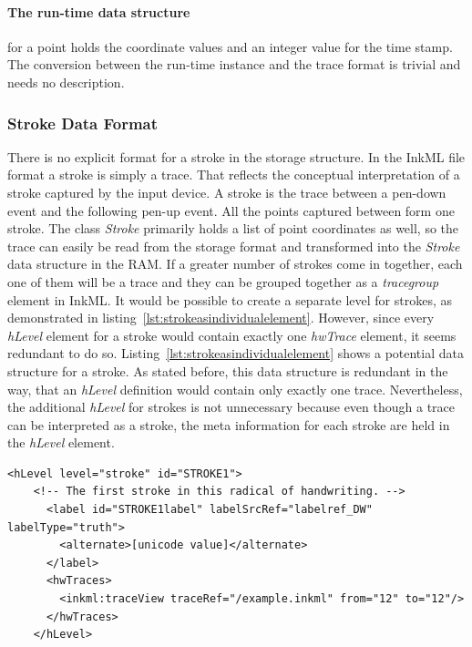 \paragraph{The run-time data structure} for a point holds the coordinate values 
and an integer value for the time stamp. The conversion between the run-time 
instance and the trace format is trivial and needs no description.

\subsubsection{Stroke Data Format}
\label{sec:hwre:strokedataformat}

There is no explicit format for a stroke in the storage structure.
In the InkML file format a stroke is simply a trace. That reflects the
conceptual interpretation of a stroke captured by the input device.
A stroke is the trace between a pen-down event and the following pen-up
event. All the points captured between form one stroke.
The class \emph{Stroke} primarily holds a list of point coordinates
as well, so the trace can easily be read from the storage format and 
transformed into the \emph{Stroke} data structure in the RAM.
If a greater number of strokes come in together, each one of them will be a trace
and they can be grouped together as a \emph{tracegroup} element in InkML.
It would be possible to create a separate level for strokes, as demonstrated
in listing~\ref{lst:strokeasindividualelement}. However, since every 
\emph{hLevel} element for a stroke would contain exactly one \emph{hwTrace} 
element, it seems redundant to do so.
Listing~\ref{lst:strokeasindividualelement} shows a potential data structure
for a stroke. As stated before, this data structure is redundant in the way, 
that an \emph{hLevel} definition would contain only exactly one trace.
Nevertheless, the additional \emph{hLevel} for strokes is not unnecessary
because even though a trace can be interpreted as a stroke,
the meta information for each stroke are held in the \emph{hLevel} element.

\begin{xmlcode}
  \begin{lstlisting}[emph={hLevel,hwTraces,label,alternative},
                     emphstyle=\color{blue}\textbf,
                     emph={[2]level,labelSrcRef,labelType,traceRef,from,to},
                     emphstyle={[2]\color{red}},
                     caption={An example of a stroke 
                              representation in UPX},
                     label=lst:strokeasindividualelement]
    <hLevel level="stroke" id="STROKE1">
    <!-- The first stroke in this radical of handwriting. -->
      <label id="STROKE1label" labelSrcRef="labelref_DW" labelType="truth">
        <alternate>[unicode value]</alternate>
      </label>
      <hwTraces>
        <inkml:traceView traceRef="/example.inkml" from="12" to="12"/>
      </hwTraces>
    </hLevel>
  \end{lstlisting}
\end{xmlcode}

